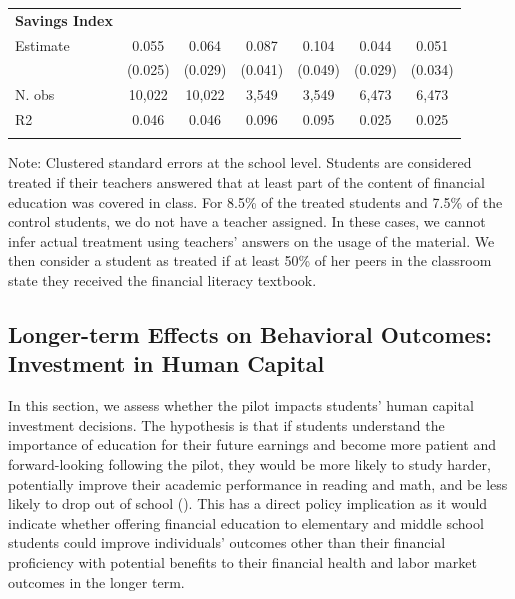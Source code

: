 \begin{table}[ht]
\begin{threeparttable}
\begin{tabular}{lcccccc}
           &            &            &            &            &            &            \\
\hline
{\bf Savings Index} &            &            &            &            &            &            \\

  Estimate &    0.055 &    0.064 &    0.087 &    0.104 &      0.044 &      0.051 \\

           &    (0.025) &    (0.029) &    (0.041) &    (0.049) &    (0.029) &    (0.034) \\

    N. obs &     10,022 &     10,022 &      3,549 &      3,549 &      6,473 &      6,473 \\

        R2 &      0.046 &      0.046 &      0.096 &      0.095 &      0.025 &      0.025 \\

\hline
\label{tab:iv}
\end{tabular}  
 \begin{tablenotes}
    \fontsize{9}{9}\selectfont 
    \item Note: Clustered standard errors at the school level. Students are considered treated if their teachers answered that at least part of the content of financial education was covered in class. For 8.5\% of the treated students and 7.5\% of the control students, we do not have a teacher assigned. In these cases, we cannot infer actual treatment using teachers' answers on the usage of the material. We then consider a student as treated if at least 50\% of her peers in the classroom state they received the financial literacy textbook.  \\      
\end{tablenotes}
\end{threeparttable}
\end{table}


\subsection{Longer-term Effects on Behavioral Outcomes: Investment in Human Capital} \label{subsec:human_capital}

In this section, we assess whether the pilot impacts students' human capital investment decisions. The hypothesis is that if students understand the importance of education for their future earnings and become more patient and forward-looking following the pilot, they would be more likely to study harder, potentially improve their academic performance in reading and math, and be less likely to drop out of school (\cite{Bruhn2016}).  This has a direct policy implication as it would indicate whether offering financial education to elementary and middle school students could improve individuals' outcomes other than their financial proficiency with potential benefits to their financial health and labor market outcomes in the longer term.

